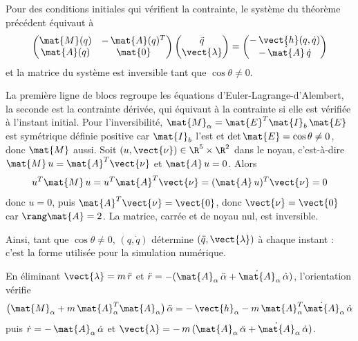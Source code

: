 \begin{proposition}
    Pour des conditions initiales qui vérifient la contrainte, le
    système du théorème précédent équivaut à
    \[
        \begin{pmatrix}
            \mat{M}(q) & -\,\mat{A}(q)^T\\
            \mat{A}(q) & \mat{0}
        \end{pmatrix}
        \begin{pmatrix}
            \ddot q\\ \vect{\lambda}
        \end{pmatrix}
        = \begin{pmatrix}
            -\,\vect{h}(q,\dot q)\\ -\,\dot{\mat{A}}\,\dot q
        \end{pmatrix}
    \]
    et la matrice du système est inversible tant que
    $\cos\theta \neq 0$.
\end{proposition}

\begin{demonstration}
    La première ligne de blocs regroupe les équations
    d'Euler-Lagrange-d'Alembert, la seconde est la contrainte dérivée,
    qui équivaut à la contrainte si elle est vérifiée à l'instant
    initial. Pour l'inversibilité, $\mat{M}_\alpha = \mat{E}^T\mat{I}_b\,
    \mat{E}$ est symétrique définie positive car $\mat{I}_b$ l'est et
    $\det\mat{E} = \cos\theta \neq 0$, donc $\mat{M}$ aussi. Soit
    $(u,\vect{\nu})\in\R^5\times\R^2$ dans le noyau, c'est-à-dire
    $\mat{M}\,u = \mat{A}^T\vect{\nu}$ et $\mat{A}\,u = 0$. Alors
    \[
        u^T\mat{M}\,u = u^T\mat{A}^T\vect{\nu}
        = (\mat{A}\,u)^T\vect{\nu} = 0
    \]
    donc $u = 0$, puis $\mat{A}^T\vect{\nu} = \vect{0}$, donc
    $\vect{\nu} = \vect{0}$ car $\rang\mat{A} = 2$. La matrice, carrée
    et de noyau nul, est inversible.
\end{demonstration}

Ainsi, tant que $\cos\theta \neq 0$, $(q,\dot q)$ détermine
$(\ddot q,\vect{\lambda})$ à chaque instant : c'est la forme utilisée
pour la simulation numérique.

\begin{corollaire}
    En éliminant $\vect{\lambda} = m\,\ddot r$ et
    $\ddot r = -(\mat{A}_\alpha\,\ddot\alpha
    + \dot{\mat{A}}_\alpha\,\dot\alpha)$, l'orientation vérifie
    \[
        \bigl(\mat{M}_\alpha + m\,\mat{A}_\alpha^T\mat{A}_\alpha\bigr)\,
        \ddot\alpha
        = -\,\vect{h}_\alpha - m\,\mat{A}_\alpha^T\dot{\mat{A}}_\alpha\,
        \dot\alpha
    \]
    puis $\dot r = -\,\mat{A}_\alpha\,\dot\alpha$ et
    $\vect{\lambda} = -\,m\,(\mat{A}_\alpha\,\ddot\alpha
    + \dot{\mat{A}}_\alpha\,\dot\alpha)$.
\end{corollaire}

